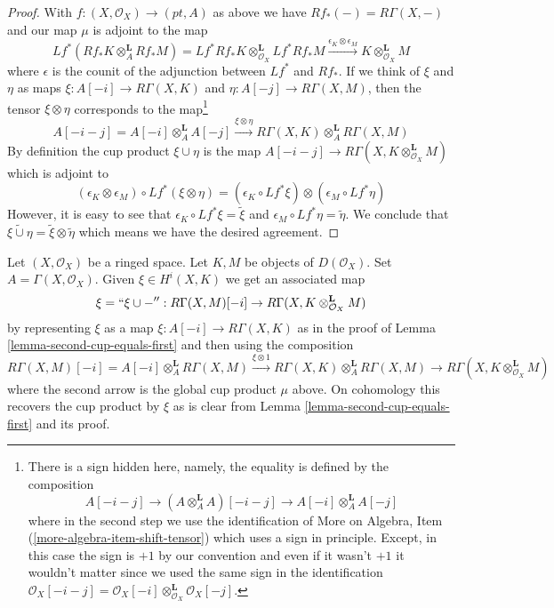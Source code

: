 \begin{proof}
With $f : (X, \mathcal{O}_X) \to (pt, A)$ as above we have
$Rf_*(-) = R\Gamma(X, -)$ and our map $\mu$ is adjoint to the map
$$
Lf^*(Rf_*K \otimes_A^\mathbf{L} Rf_*M) =
Lf^*Rf_*K \otimes_{\mathcal{O}_X}^\mathbf{L} Lf^*Rf_*M
\xrightarrow{\epsilon_K \otimes \epsilon_M}
K \otimes_{\mathcal{O}_X}^\mathbf{L} M
$$
where $\epsilon$ is the counit of the adjunction between
$Lf^*$ and $Rf_*$.
If we think of $\xi$ and $\eta$ as maps $\xi : A[-i] \to R\Gamma(X, K)$
and $\eta : A[-j] \to R\Gamma(X, M)$, then
the tensor $\xi \otimes \eta$ corresponds to the map\footnote{There
is a sign hidden here, namely, the equality is defined by
the composition
$$
A[-i - j] \to (A \otimes_A^\mathbf{L} A)[-i - j] \to
A[-i] \otimes_A^\mathbf{L} A[-j]
$$
where in the second step we use the identification of
More on Algebra, Item (\ref{more-algebra-item-shift-tensor})
which uses a sign in principle.
Except, in this case the sign is $+1$ by our convention and even if it wasn't
$+1$ it wouldn't matter since we used the same sign
in the identification
$\mathcal{O}_X[-i - j] =
\mathcal{O}_X[-i] \otimes_{\mathcal{O}_X}^\mathbf{L} \mathcal{O}_X[-j]$.}
$$
A[-i - j] = A[-i] \otimes_A^\mathbf{L} A[-j]
\xrightarrow{\xi \otimes \eta}
R\Gamma(X, K) \otimes_A^\mathbf{L} R\Gamma(X, M)
$$
By definition the cup product $\xi \cup \eta$ is the map
$A[-i - j] \to R\Gamma(X, K \otimes_{\mathcal{O}_X}^\mathbf{L} M)$
which is adjoint to
$$
(\epsilon_K \otimes \epsilon_M) \circ Lf^*(\xi \otimes \eta) =
(\epsilon_K \circ Lf^*\xi) \otimes (\epsilon_M \circ Lf^*\eta)
$$
However, it is easy to see that
$\epsilon_K \circ Lf^*\xi = \tilde \xi$ and
$\epsilon_M \circ Lf^*\eta = \tilde \eta$.
We conclude that $\widetilde{\xi \cup \eta} = \tilde \xi \otimes \tilde \eta$
which means we have the desired agreement.
\end{proof}

\begin{remark}
\label{remark-cup-with-element-map-total-cohomology}
Let $(X, \mathcal{O}_X)$ be a ringed space. Let $K, M$ be objects
of $D(\mathcal{O}_X)$. Set $A = \Gamma(X, \mathcal{O}_X)$.
Given $\xi \in H^i(X, K)$ we get an associated map
$$
\xi = ``\xi \cup -'' :
R\Gamma(X, M)[-i]
\to
R\Gamma(X, K \otimes_{\mathcal{O}_X}^\mathbf{L} M)
$$
by representing $\xi$ as a map $\xi : A[-i] \to R\Gamma(X, K)$ as in the
proof of Lemma \ref{lemma-second-cup-equals-first}
and then using the composition
$$
R\Gamma(X, M)[-i] = A[-i] \otimes_A^\mathbf{L} R\Gamma(X, M)
\xrightarrow{\xi \otimes 1}
R\Gamma(X, K) \otimes_A^\mathbf{L} R\Gamma(X, M)
\to
R\Gamma(X, K \otimes_{\mathcal{O}_X}^\mathbf{L} M)
$$
where the second arrow is the global cup product $\mu$ above.
On cohomology this recovers the cup product by $\xi$ as is clear
from Lemma \ref{lemma-second-cup-equals-first} and its proof.
\end{remark}


